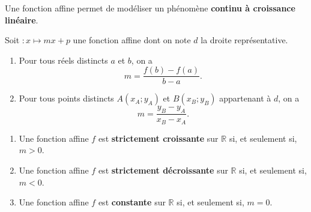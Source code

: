 \documentclass[11pt]{article}
\begin{document}
\begin{rmq}
  Une fonction affine permet de modéliser un phénomène \textbf{continu à
  croissance linéaire}.
\end{rmq}

\begin{prop}
  Soit $:x\mapsto mx+p$ une fonction affine dont on note $d$ la droite
  représentative.
  \begin{enumerate}
    \item Pour tous réels distincts $a$ et $b$, on a
      \[
        m = \frac{f(b)-f(a)}{b-a}.
      \]
    \item Pour tous points distincts $A(x_A;y_A)$ et $B(x_B;y_B)$ appartenant à
      $d$, on a
      \[
        m = \frac{y_B-y_A}{x_B-x_A}.
      \]
  \end{enumerate}
\end{prop}

\begin{prop}
  \begin{enumerate}
    \item Une fonction affine $f$ est \textbf{strictement croissante} sur
      $\mathbb{R}$ si, et seulement si, $m>0$.
    \item Une fonction affine $f$ est \textbf{strictement d\'ecroissante} sur
      $\mathbb{R}$ si, et seulement si, $m<0$.
    \item Une fonction affine $f$ est \textbf{constante} sur
      $\mathbb{R}$ si, et seulement si, $m=0$.
  \end{enumerate}
\end{prop}
\end{document}
